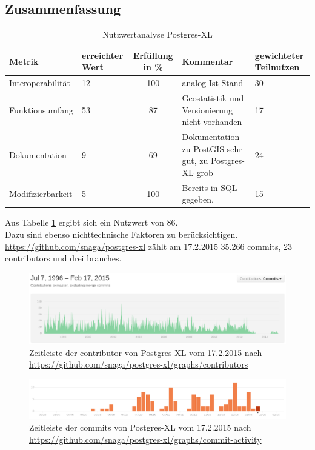 \subsection{Zusammenfassung}
\begin{table}[h!]
\centering
\small
\begin{tabular}{l|p{1.8cm}|c|p{3.1cm}|p{1.8cm}}
\textbf{Metrik} & \textbf{erreichter Wert} & \textbf{Erfüllung in \%} & \textbf{Kommentar} & \textbf{gewichteter Teilnutzen} \\ \hline
Interoperabilität & 12 & 100 & analog Ist-Stand & 30 \\ \hline
Funktionsumfang & 53 & 87 & Geostatistik und Versionierung nicht vorhanden & 17 \\ \hline
Dokumentation & 9 & 69 & Dokumentation zu PostGIS sehr gut, zu Postgres-XL grob & 24 \\ \hline
Modifizierbarkeit & 5 & 100 & Bereits in SQL gegeben. & 15 \\
\end{tabular}
\caption{Nutzwertanalyse Postgres-XL}
\label{table:nutzwertanalyse-postgresxl}
\end{table}
Aus Tabelle \ref{table:nutzwertanalyse-postgresxl} ergibt sich ein Nutzwert von 86.\\
Dazu sind ebenso nichttechnische Faktoren zu berücksichtigen.\\
\url{https://github.com/snaga/postgres-xl} zählt am 17.2.2015 35.266 commits, 23 contributors und drei branches.
\begin{figure}[h!]
\centering
\includegraphics[width=\textwidth]{Abbildungen/postgresxl_timeline_contributors.png}
\caption[Zeitleiste der contributor von Postgres-XL]{Zeitleiste der contributor von Postgres-XL vom 17.2.2015 nach \url{https://github.com/snaga/postgres-xl/graphs/contributors}}
\label{fig:timeline_contr_postgresxl}
\end{figure}
\begin{figure}[h!]
\centering
\includegraphics[width=\textwidth]{Abbildungen/postgresxl_timeline_commits.png}
\caption[Zeitleiste der commits von Postgres-XL]{Zeitleiste der commits von Postgres-XL vom 17.2.2015 nach \url{https://github.com/snaga/postgres-xl/graphs/commit-activity}}
\label{fig:timeline_commits_postgresxl}
\end{figure}
